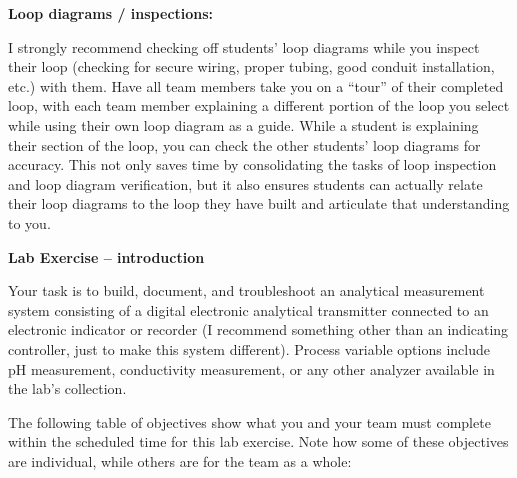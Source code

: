 












\noindent
{\bf Loop diagrams / inspections:}

I strongly recommend checking off students' loop diagrams while you inspect their loop (checking for secure wiring, proper tubing, good conduit installation, etc.) with them.  Have all team members take you on a ``tour'' of their completed loop, with each team member explaining a different portion of the loop you select while using their own loop diagram as a guide.  While a student is explaining their section of the loop, you can check the other students' loop diagrams for accuracy.  This not only saves time by consolidating the tasks of loop inspection and loop diagram verification, but it also ensures students can actually relate their loop diagrams to the loop they have built and articulate that understanding to you.






\noindent

\vskip 5pt

{\bf Lab Exercise -- introduction}

\vskip 5pt

Your task is to build, document, and troubleshoot an analytical measurement system consisting of a digital electronic analytical transmitter connected to an electronic indicator or recorder (I recommend something other than an indicating controller, just to make this system different).  Process variable options include pH measurement, conductivity measurement, or any other analyzer available in the lab's collection.  

The following table of objectives show what you and your team must complete within the scheduled time for this lab exercise.  Note how some of these objectives are individual, while others are for the team as a whole:


